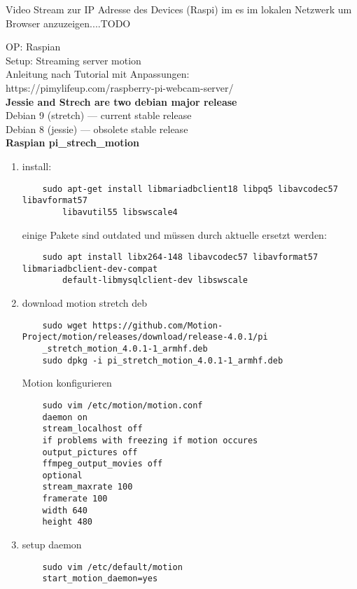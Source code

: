 Video Stream zur IP Adresse des Devices (Raspi) im es im lokalen 
Netzwerk um Browser anzuzeigen....TODO

OP: Raspian\\
Setup: Streaming server motion\\

Anleitung nach Tutorial mit Anpassungen:\\
https://pimylifeup.com/raspberry-pi-webcam-server/\\

\textbf{Jessie and Strech are two debian major release}\\
Debian 9 (stretch) — current stable release\\
Debian 8 (jessie) — obsolete stable release\\

\textbf{Raspian pi\_strech\_motion}

\begin{enumerate}
	\item install:
	\begin{verbatim}
	sudo apt-get install libmariadbclient18 libpq5 libavcodec57  libavformat57
	    libavutil55 libswscale4
	\end{verbatim}
	einige Pakete sind outdated und müssen durch aktuelle ersetzt werden:
	\begin{verbatim}	
	sudo apt install libx264-148 libavcodec57 libavformat57 libmariadbclient-dev-compat 	
	    default-libmysqlclient-dev libswscale
	\end{verbatim}
	\item download motion stretch deb
	\begin{verbatim}
	sudo wget https://github.com/Motion-Project/motion/releases/download/release-4.0.1/pi
	_stretch_motion_4.0.1-1_armhf.deb
	sudo dpkg -i pi_stretch_motion_4.0.1-1_armhf.deb
	\end{verbatim}
	Motion konfigurieren
	\begin{verbatim}	
	sudo vim /etc/motion/motion.conf
	daemon on
	stream_localhost off
	if problems with freezing if motion occures
	output_pictures off
	ffmpeg_output_movies off
	optional
	stream_maxrate 100
	framerate 100
	width 640
	height 480
	\end{verbatim}
	
	\item setup daemon
	\begin{verbatim}
	sudo vim /etc/default/motion
	start_motion_daemon=yes
	\end{verbatim}
\end{enumerate}

